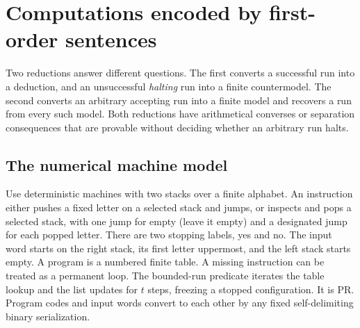 \section{Computations encoded by first-order sentences}\label{sec:computability}
Two reductions answer different questions. The first converts a successful run into a deduction, and an unsuccessful \emph{halting} run into a finite countermodel. The second converts an arbitrary accepting run into a finite model and recovers a run from every such model. Both reductions have arithmetical converses or separation consequences that are provable without deciding whether an arbitrary run halts.

\subsection{The numerical machine model}
Use deterministic machines with two stacks over a finite alphabet. An instruction either pushes a fixed letter on a selected stack and jumps, or inspects and pops a selected stack, with one jump for empty (leave it empty) and a designated jump for each popped letter. There are two stopping labels, yes and no. The input word starts on the right stack, its first letter uppermost, and the left stack starts empty. A program is a numbered finite table. A missing instruction can be treated as a permanent loop. The bounded-run predicate iterates the table lookup and the list updates for $t$ steps, freezing a stopped configuration. It is PR. Program codes and input words convert to each other by any fixed self-delimiting binary serialization.

